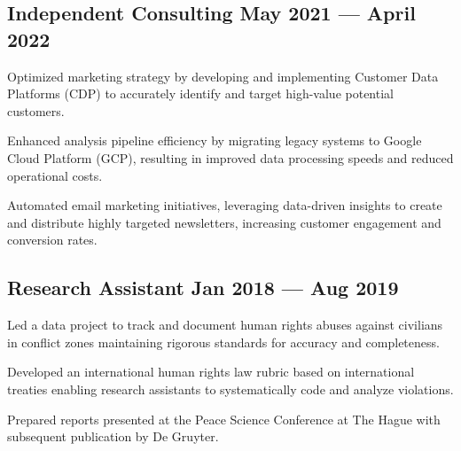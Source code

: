 \documentclass[doublesided, paper=a4, fontsize=11.0pt]{my-resume}
\begin{document}
{\begin{zitemize}
    \end{zitemize}

    \subsection{Independent Consulting \hfill May 2021 --- April 2022}
    \begin{zitemize}
        \item Optimized marketing strategy by developing and implementing Customer Data Platforms (CDP) to accurately identify and target high-value potential customers.
        \item Enhanced analysis pipeline efficiency by migrating legacy systems to Google Cloud Platform (GCP), resulting in improved data processing speeds and reduced operational costs.
        \item Automated email marketing initiatives, leveraging data-driven insights to create and distribute highly targeted newsletters, increasing customer engagement and conversion rates.
    \end{zitemize}

    \subsection{Research Assistant \hfill Jan 2018 --- Aug 2019}
    \begin{zitemize}
        \item Led a data project to track and document human rights abuses against civilians in conflict zones maintaining rigorous standards for accuracy and completeness.
        \item Developed an international human rights law rubric based on international treaties enabling research assistants to systematically code and analyze violations.
        \item Prepared reports presented at the Peace Science Conference at The Hague with subsequent publication by De Gruyter.
    \end{zitemize}




}
\end{document}
